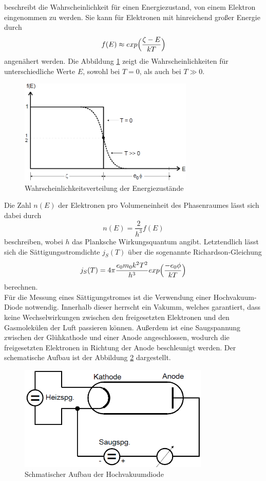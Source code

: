 beschreibt die Wahrscheinlichkeit für einen Energiezustand, von einem Elektron eingenommen zu werden. 
Sie kann für Elektronen mit hinreichend großer Energie durch 
\begin{equation}
    f(E) \approx exp \Bigl(\frac{\zeta-E}{kT}\Bigr)
\end{equation} angenähert werden. Die Abbildung \ref{fig:fermi} zeigt die Wahrscheinlichkeiten für unterschiedliche Werte $E$, sowohl bei 
$T=0$, als auch bei $T \gg 0$.
\begin{figure}
    \centering
    \includegraphics[height=5cm]{data/fermi.png}
    \caption{Wahrscheinlichkeitsverteilung der Energiezustände}
    \label{fig:fermi}
\end{figure}
\FloatBarrier
Die Zahl $n(E)$ der Elektronen pro Volumeneinheit des Phasenraumes lässt sich dabei durch 
\begin{equation}
    n(E) = \frac{2}{h^3} f(E)
\end{equation}  
beschreiben, wobei $h$ das Planksche Wirkungsquantum angibt. Letztendlich lässt sich die Sättigungsstromdichte $j_S(T)$ über die sogenannte
Richardson-Gleichung 
\begin{equation}
    j_S(T) = 4\pi \frac{e_0 m_0 k^2 T^2}{h^3} exp\Bigl(\frac{-e_0 \phi}{kT}\Bigr)
    \label{eqn:richard}
\end{equation}
berechnen. 
\\
Für die Messung eines Sättigungstromes ist die Verwendung einer Hochvakuum-Diode notwendig. Innerhalb dieser herrscht ein Vakumm, welches 
garantiert, dass keine Wechselwirkungen zwischen den freigesetzten Elektronen und den Gasmolekülen der Luft passieren können. Außerdem ist 
eine Saugspannung zwischen der Glühkathode und einer Anode angeschlossen, wodurch die freigesetzten Elektronen in Richtung der Anode beschleunigt
werden. Der schematische Aufbau ist der Abbildung \ref{fig:diode} dargestellt.
\begin{figure}
    \centering
    \includegraphics[height=5cm]{data/aufbau.png}
    \caption{Schmatischer Aufbau der Hochvakuumdiode}
    \label{fig:diode}
\end{figure}
